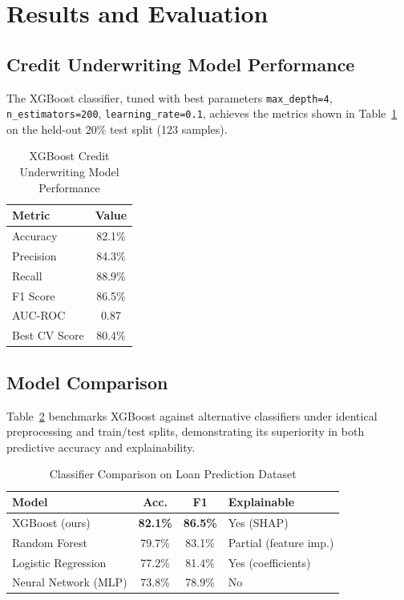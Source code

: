 \documentclass[conference]{IEEEtran}
\begin{document}
\section{Results and Evaluation}
\label{sec:results}

\subsection{Credit Underwriting Model Performance}

The XGBoost classifier, tuned with best parameters
\texttt{max\_depth=4}, \texttt{n\_estimators=200},
\texttt{learning\_rate=0.1}, achieves the metrics
shown in Table~\ref{tab:modelperf} on the held-out
20\% test split (123 samples).

\begin{table}[H]
\centering
\caption{XGBoost Credit Underwriting Model Performance}
\label{tab:modelperf}
\renewcommand{\arraystretch}{1.15}
\begin{tabular}{@{}lc@{}}
\toprule
\textbf{Metric} & \textbf{Value} \\
\midrule
Accuracy        & 82.1\%  \\
Precision       & 84.3\%  \\
Recall          & 88.9\%  \\
F1 Score        & 86.5\%  \\
AUC-ROC         & 0.87    \\
Best CV Score   & 80.4\%  \\
\bottomrule
\end{tabular}
\end{table}

\subsection{Model Comparison}

Table~\ref{tab:modelcomp} benchmarks XGBoost against
alternative classifiers under identical preprocessing
and train/test splits, demonstrating its superiority
in both predictive accuracy and explainability.

\begin{table}[H]
\centering
\caption{Classifier Comparison on Loan Prediction Dataset}
\label{tab:modelcomp}
\renewcommand{\arraystretch}{1.15}
\begin{tabular}{@{}lccl@{}}
\toprule
\textbf{Model} & \textbf{Acc.} & \textbf{F1} &
\textbf{Explainable} \\
\midrule
XGBoost (ours)        & \textbf{82.1\%} & \textbf{86.5\%}
  & Yes (SHAP)   \\
Random Forest         & 79.7\% & 83.1\% & Partial (feature imp.) \\
Logistic Regression   & 77.2\% & 81.4\% & Yes (coefficients) \\
Neural Network (MLP)  & 73.8\% & 78.9\% & No \\
\bottomrule
\end{tabular}
\end{table}
\end{document}
